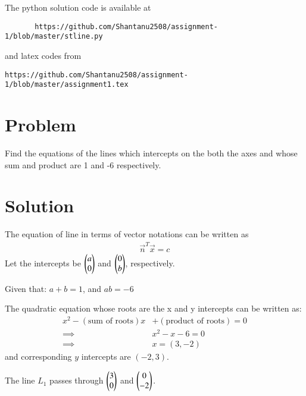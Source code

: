 \documentclass[journal,12pt,twocolumn]{IEEEtran}
\begin{document}
The python solution code is available at
\begin{lstlisting}
       https://github.com/Shantanu2508/assignment-1/blob/master/stline.py
\end{lstlisting}
%
and latex codes from 
\begin{lstlisting}
https://github.com/Shantanu2508/assignment-1/blob/master/assignment1.tex
\end{lstlisting}
%
\section{Problem}
Find the equations of the lines which intercepts on the both the axes and whose
	sum and product are 1 and -6 respectively.

\section{Solution}
	The equation of line in terms of vector notations can be written as
\begin{align}
	\vec{n}^T \vec{x} = c  
\end{align}
Let the intercepts be $\begin{pmatrix}a \\ 0\end{pmatrix}$ and $\begin{pmatrix}0 \\ b\end{pmatrix}$, respectively.

	Given that: \quad $ a + b = 1 $, \quad and \quad $ ab = -6$ 

The quadratic equation whose roots are the x and y intercepts can be written as:
\begin{align}
	x^2 - (\text{sum of roots})x &+ (\text{product of roots}) = 0 \\
	\implies \qquad & x^2 - x -6 =0 \\
	\implies \qquad & x=(3,-2) 
\end{align}
and corresponding $y$ intercepts are $(-2,3)$. 

The line $L_1$ passes through $\begin{pmatrix}3 \\ 0\end{pmatrix}$ and $\begin{pmatrix}0 \\ -2\end{pmatrix}$.
\end{document}
